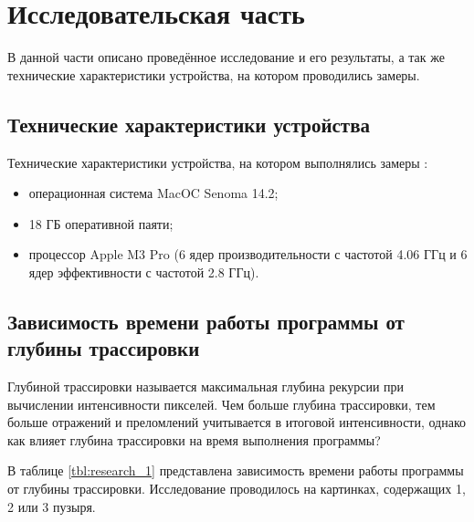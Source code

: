 \chapter{Исследовательская часть}

В данной части описано проведённое исследование и его результаты, а так же технические характеристики устройства, на котором проводились замеры.

\section{Технические характеристики устройства}

Технические характеристики устройства, на котором выполнялись замеры \cite{macos}:

\begin{itemize}
    \item операционная система MacOC Senoma 14.2;
    \item 18 ГБ оперативной паяти;
    \item процессор Apple M3 Pro (6 ядер производительности с частотой 4.06 ГГц и 6 ядер эффективности с частотой 2.8 ГГц).
\end{itemize}


\section{Зависимость времени работы программы от глубины трассировки}

Глубиной трассировки называется максимальная глубина рекурсии при вычислении интенсивности пикселей. Чем больше глубина трассировки, тем больше отражений и преломлений учитывается в итоговой интенсивности, однако как влияет глубина трассировки на время выполнения программы?

\clearpage

В таблице \ref{tbl:research_1} представлена зависимость времени работы программы от глубины трассировки. Исследование проводилось на картинках, содержащих 1, 2 или 3 пузыря.

